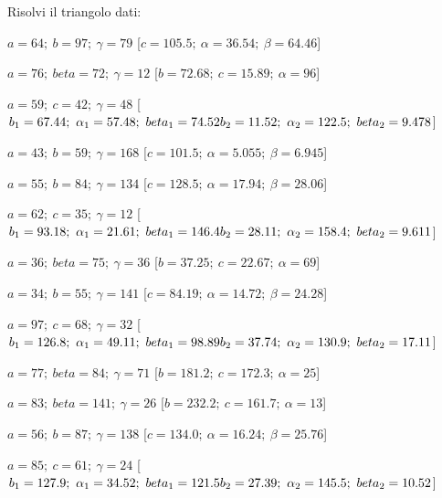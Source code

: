 

\begin{esercizio}\label{ese:}
 Risolvi il triangolo dati:
 \begin{enumeratea}
  \item  \(a=64;~b=97;~\gamma=79\)
   \hfill [\(c=105.5;~\alpha=36.54;~\beta=64.46\)]
  \item  \(a=76;~beta=72;~\gamma=12\)
   \hfill [\(b=72.68;~c=15.89;~\alpha=96\)]
  \item  \(a=59;~c=42;~\gamma=48\)
   \hfill [\(b_1=67.44;~\alpha_1=57.48;~beta_1=74.52 \\
   {} \hfill    b_2=11.52;~\alpha_2=122.5;~beta_2=9.478\)]
  \item  \(a=43;~b=59;~\gamma=168\)
   \hfill [\(c=101.5;~\alpha=5.055;~\beta=6.945\)]
  \item  \(a=55;~b=84;~\gamma=134\)
   \hfill [\(c=128.5;~\alpha=17.94;~\beta=28.06\)]
  \item  \(a=62;~c=35;~\gamma=12\)
   \hfill [\(b_1=93.18;~\alpha_1=21.61;~beta_1=146.4 \\
   {} \hfill          b_2=28.11;~\alpha_2=158.4;~beta_2=9.611\)]
  \item  \(a=36;~beta=75;~\gamma=36\)
   \hfill [\(b=37.25;~c=22.67;~\alpha=69\)]
  \item  \(a=34;~b=55;~\gamma=141\)
   \hfill [\(c=84.19;~\alpha=14.72;~\beta=24.28\)]
  \item  \(a=97;~c=68;~\gamma=32\)
   \hfill [\(b_1=126.8;~\alpha_1=49.11;~beta_1=98.89 \\
   {} \hfill          b_2=37.74;~\alpha_2=130.9;~beta_2=17.11\)]
  \item  \(a=77;~beta=84;~\gamma=71\)
   \hfill [\(b=181.2;~c=172.3;~\alpha=25\)]
  \item  \(a=83;~beta=141;~\gamma=26\)
   \hfill [\(b=232.2;~c=161.7;~\alpha=13\)]
  \item  \(a=56;~b=87;~\gamma=138\)
   \hfill [\(c=134.0;~\alpha=16.24;~\beta=25.76\)]
  \item  \(a=85;~c=61;~\gamma=24\)
   \hfill [\(b_1=127.9;~\alpha_1=34.52;~beta_1=121.5 \\
   {} \hfill          b_2=27.39;~\alpha_2=145.5;~beta_2=10.52\)]

\end{enumeratea}
\end{esercizio}
